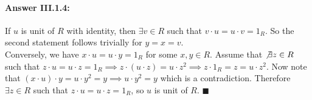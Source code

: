 \documentclass{article}
\theoremstyle{definition}
\theoremstyle{remark}
\theoremstyle{definition}
\theoremstyle{definition}
\newenvironment{customproof}[1]{\paragraph{Answer #1:}}{\hfill\ensuremath{\blacksquare}}
\begin{document}
\hrulefill
\begin{customproof}{III.1.4}
	If $ u $ is unit of $ R $ with identity, then $\exists v\in R$ such that $ v\cdot u = u\cdot v = 1_R $. So the second statement follows trivially for $ y=x=v $.\\
	Conversely, we have $ x\cdot u = u\cdot y = 1_R $ for some $ x,y\in R $. Assume that $ \not\exists z\in R $ such that $ z\cdot u = u \cdot z = 1_R \implies z\cdot(u\cdot z) = u\cdot z^2 \implies z\cdot 1_R = z = u\cdot z^2$. Now note that $ (x\cdot u)\cdot y = u\cdot y^2 = y \implies u\cdot y^2 = y$ which is a contradiction. Therefore $ \exists z\in R $ such that $ z\cdot u = u\cdot z = 1_R $, so $ u $ is unit of $ R $.
\end{customproof}

\hrulefill
\end{document}
